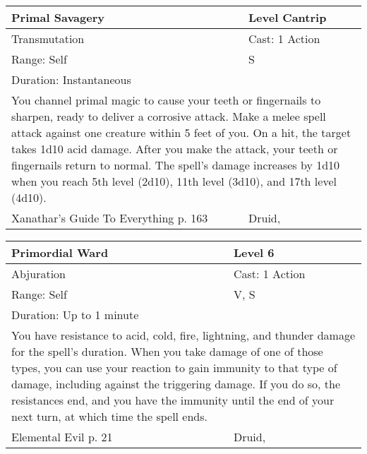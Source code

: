 \documentclass[11pt]{report}
\begin{document}
\begin{table}[H]
	\begin{tabular}{||p{6cm}|p{6cm}||}
		\hline\hline
		\bf{Primal Savagery} & Level Cantrip\\ \hline
		Transmutation & Cast: 1 Action\\ \hline
		Range: Self & S\\ \hline
		Duration: Instantaneous & \\ \hline
		\multicolumn{2}{||p{12cm}||}{You channel primal magic to cause your teeth or fingernails to sharpen, ready to deliver a corrosive attack. Make a melee spell attack against one creature within 5 feet of you. On a hit, the target takes 1d10 acid damage. After you make the attack, your teeth or fingernails return to normal. The spell’s damage increases by 1d10 when you reach 5th level (2d10), 11th level (3d10), and 17th level (4d10).}\\ \hline
Xanathar's Guide To Everything p. 163 & Druid, \\ \hline\hline
	\end{tabular}
\end{table}

\begin{table}[H]
	\begin{tabular}{||p{6cm}|p{6cm}||}
		\hline\hline
		\bf{Primordial Ward} & Level 6\\ \hline
		Abjuration & Cast: 1 Action\\ \hline
		Range: Self & V, S\\ \hline
		Duration: Up to 1 minute & \\ \hline
		\multicolumn{2}{||p{12cm}||}{You have resistance to acid, cold, fire, lightning, and thunder damage for the spell’s duration.
When you take damage of one of those types, you can use your reaction to gain immunity to that type
of damage, including against the triggering damage. If you do so, the resistances end, and you have the immunity until the end of your next turn, at which time the spell ends.}\\ \hline
Elemental Evil p. 21 & Druid, \\ \hline\hline
	\end{tabular}
\end{table}
\end{document}
